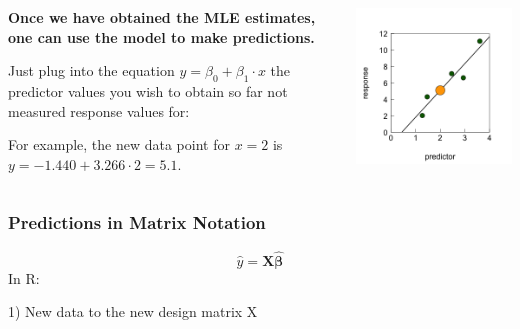 \documentclass{beamer}
\begin{document}
\begin{frame}
    \frametitle{}
    \begin{columns}
        \begin{column}{0.5\textwidth}
            \textbf{Once we have obtained the MLE estimates, one can use the model to make predictions.}
            \vspace{0.5cm}
    
            Just plug into the equation $y = \beta_0 + \beta_1 \cdot x$ the predictor values you wish to obtain so far not measured response values for:
            \vspace{0.5cm}
            
            For example, the new data point for $x = 2$ is $y = -1.440 + 3.266 \cdot 2 = 5.1$.
        \end{column}
        \begin{column}{0.5\textwidth}
            \includegraphics[width=\textwidth]{lectures/day_2_LM_refresh_I/figures/unnamed-chunk-29-1.png}    
        \end{column}
    \end{columns}
\end{frame}

\begin{frame}
    \frametitle{Predictions in Matrix Notation}
    \begin{equation*}
        \hat{y} = \mathbf{X \hat{\beta}}
    \end{equation*}
    In R:
    \vspace{0.5cm}
    
    1) New data to the new design matrix X
    \scalebox{0.65}{
      
    }
\end{frame}
\end{document}
